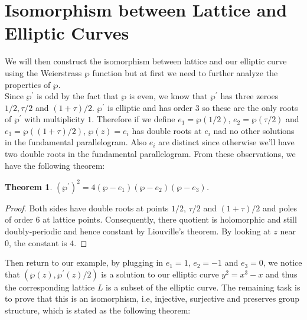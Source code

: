\documentclass[psamsfonts]{amsart}
\newtheorem{theorem}{Theorem}[section]
\theoremstyle{definition}
\theoremstyle{remark}
\numberwithin{equation}{section}
\begin{document}
		\section{Isomorphism between Lattice and Elliptic Curves}
		We will then construct the isomorphism between lattice and our elliptic curve using the Weierstrass $\wp$ function but at first we need to further analyze the properties of $\wp$.\\
		\indent Since $\wp^\prime$ is odd by the fact that $\wp$ is even, we know that $\wp^\prime$ has three zeroes $1/2,\tau/2$ and $(1+\tau)/2$. $\wp^\prime$ is elliptic and has order $3$ so these are the only roots of $\wp^\prime$ with multiplicity $1$. Therefore if we define $e_1 = \wp(1/2)$, $e_2 = \wp(\tau/2)$ and $e_3 = \wp((1+\tau)/2)$, $\wp(z) = e_i$ has double roots at $e_i$ nad no other solutions in the fundamental parallelogram. Also $e_i$ are distinct since otherwise we'll have two double roots in the fundamental parallelogram. From these observations, we have the following theorem:
		\begin{theorem}
			$(\wp^\prime)^2 = 4(\wp - e_1)(\wp - e_2)(\wp - e_3)$. 
		\end{theorem}
		\begin{proof}
			Both sides have double roots at points $1/2$, $\tau/2$ and $(1+\tau)/2$ and poles of order $6$ at lattice points. Consequently, there quotient is holomorphic and still doubly-periodic and hence constant by Liouville's theorem. By looking at $z$ near $0$, the constant is $4$.
		\end{proof}
		Then return to our example, by plugging in $e_1 = 1$, $e_2 = -1$ and $e_3 = 0$, we notice that $(\wp(z),\wp^\prime(z)/2)$ is a solution to our elliptic curve $y^2 = x^3 - x$ and thus the corresponding lattice $L$ is a subset of the elliptic curve. The remaining task is to prove that this is an isomorphism, i.e, injective, surjective and preserves group structure, which is stated as the following theorem: 
		
\end{document}
